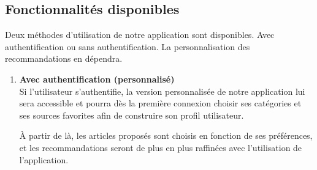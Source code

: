 \subsection{Fonctionnalités disponibles}
Deux méthodes d'utilisation de notre application sont disponibles. Avec authentification ou sans authentification. La personnalisation des recommandations en dépendra.
\begin{enumerate}[leftmargin=*]
    \item\textbf{Avec authentification (personnalisé)}\\
    Si l'utilisateur s'authentifie, la version personnalisée de notre application lui sera accessible et pourra dès la première connexion choisir ses catégories et ses sources favorites afin de construire son profil utilisateur.
    
    À partir de là, les articles proposés sont choisis en fonction de ses préférences, et les recommandations seront de plus en plus raffinées avec l'utilisation de l'application.
    

\end{enumerate}
